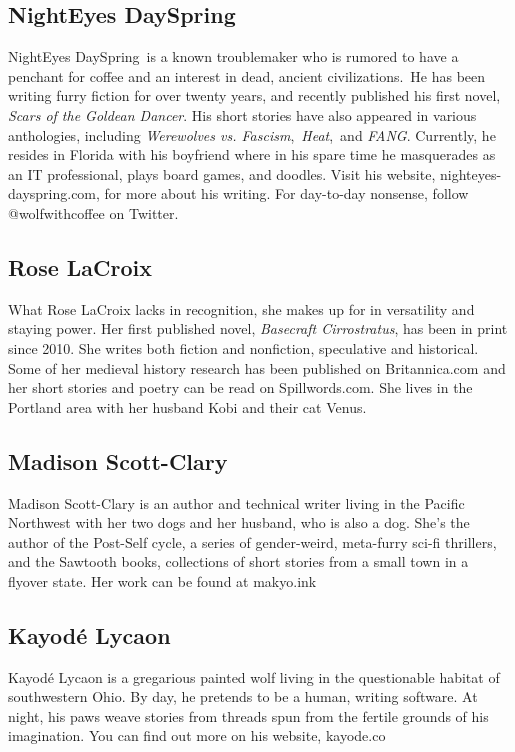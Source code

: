 \subsection*{NightEyes DaySpring}
NightEyes DaySpring is a known troublemaker who is rumored to have a penchant for coffee and an interest in dead, ancient civilizations. He has been writing furry fiction for over twenty years, and recently published his first novel, \emph{Scars of the Goldean Dancer}. His short stories have also appeared in various anthologies, including \emph{Werewolves vs. Fascism}, \emph{Heat}, and \emph{FANG}. Currently, he resides in Florida with his boyfriend where in his spare time he masquerades as an IT professional, plays board games, and doodles. Visit his website, nighteyes-dayspring.com, for more about his writing. For day-to-day nonsense, follow @wolfwithcoffee on Twitter.

\subsection*{Rose LaCroix}

What Rose LaCroix lacks in recognition, she makes up for in versatility and staying power. Her first published novel, \emph{Basecraft Cirrostratus}, has been in print since 2010. She writes both fiction and nonfiction, speculative and historical. Some of her medieval history research has been published on Britannica.com and her short stories and poetry can be read on Spillwords.com. She lives in the Portland area with her husband Kobi and their cat Venus.

\subsection*{Madison Scott-Clary}
Madison Scott-Clary is an author and technical writer living in the Pacific Northwest with her two dogs and her husband, who is also a dog. She's the author of the Post-Self cycle, a series of gender-weird, meta-furry sci-fi thrillers, and the Sawtooth books, collections of short stories from a small town in a flyover state. Her work can be found at makyo.ink

\subsection*{Kayodé Lycaon}
Kayodé Lycaon is a gregarious painted wolf living in the questionable habitat of southwestern Ohio. By day, he pretends to be a human, writing software. At night, his paws weave stories from threads spun from the fertile grounds of his imagination. You can find out more on his website, kayode.co

